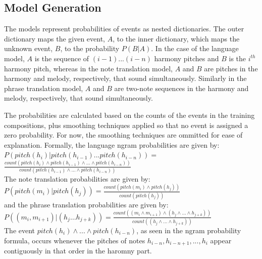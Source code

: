 \documentclass{sig-alternate}
\begin{document}
\subsection{Model Generation}
The models represent probabilities of events as nested dictionaries. The outer dictionary maps the given event, $A$, to the inner dictionary, which maps the unknown event, $B$, to the probability $P(B | A)$. In the case of the language model, $A$ is the sequence of $(i - 1) ... (i - n)$ harmony pitches and $B$ is the $i^{th}$ harmony pitch, whereas in the note translation model, $A$ and $B$  are pitches in the harmony and melody, respectively, that sound simultaneously. Similarly in the phrase translation model, $A$ and $B$ are two-note sequences in the harmony and melody, respectively, that sound simultaneously.

The probabilities are calculated based on the counts of the events in the training compositions, plus smoothing techniques applied so that no event is assigned a zero probability. For now, the smoothing techniques are ommitted for ease of explanation. Formally, the language ngram probabilities are given by: \\

$P(pitch(h_{i}) | pitch(h_{i - 1}) ... pitch(h_{i - n})) = $\\

$\frac{count(pitch(h_{i}) \wedge pitch(h_{i - 1}) \wedge ... \wedge pitch(h_{i - n}))}{count(pitch(h_{i - 1}) \wedge ... \wedge pitch(h_{i - n}))}$\\

The note translation probabilities are given by:\\

$P(pitch(m_{i}) | pitch(h_{j})) = \frac{count(pitch(m_{i}) \wedge pitch(h_{j}))}{count(pitch(h_{j}))}$\\

and the phrase translation probabilities are given by:\\

$P((m_{i}, m_{i+1}) | (h_{j} \ldots h_{j+k})) = \frac{count((m_{i} \wedge m_{i+1}) \wedge (h_{j} \wedge \ldots \wedge h_{j+k}))}{count((h_{j} \wedge \ldots \wedge h_{j+k}))}$\\

The event $pitch(h_{i}) \wedge ... \wedge pitch(h_{i - n})$, as seen in the ngram probability formula, occurs whenever the pitches of notes $h_{i - n}, h_{i - n + 1}, ..., h_{i}$ appear contiguously in that order in the haromny part. 
\end{document}
